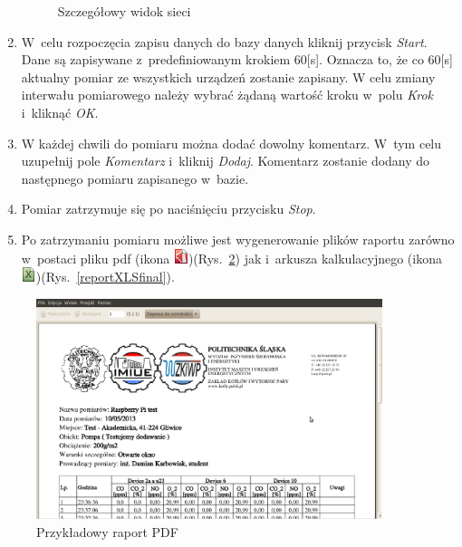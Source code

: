 \begin{enumerate}
\begin{figure}[!htb]
  \hspace{1mm}
\caption{Szczegółowy widok sieci} 	
\label{detailNetwork}
\end{figure}
\item W~celu rozpoczęcia zapisu danych do bazy danych kliknij przycisk \textit{Start}. Dane są zapisywane z~predefiniowanym krokiem 60[s]. Oznacza to, że co 60[s] aktualny pomiar ze wszystkich urządzeń zostanie zapisany. W celu zmiany interwału pomiarowego należy wybrać żądaną wartość kroku w~polu \textit{Krok} i~kliknąć \textit{OK}.
\item W każdej chwili do pomiaru można dodać dowolny komentarz. W~tym celu uzupełnij pole \textit{Komentarz} i~kliknij \textit{Dodaj}. Komentarz zostanie dodany do następnego pomiaru zapisanego w~bazie. 
\item Pomiar zatrzymuje się po naciśnięciu przycisku \textit{Stop}.
\item Po zatrzymaniu pomiaru możliwe jest wygenerowanie plików raportu zarówno w~postaci pliku pdf (ikona \includegraphics[scale=0.75]{images/pdfIco})(Rys.~\ref{reportPDFfinal}) jak i~arkusza kalkulacyjnego (ikona \includegraphics[scale=0.75]{images/excel})(Rys.~\ref{reportXLSfinal}).
\end{enumerate}

\begin{figure}[!htb] 	\centering 	\includegraphics[width=0.9\textwidth]{images/pdf} 	\caption{Przykładowy raport PDF} \label{reportPDFfinal} \end{figure} 

